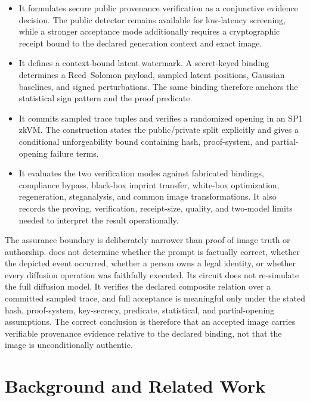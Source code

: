 \begin{itemize}
    \item It formulates secure public provenance verification as a conjunctive
    evidence decision.  The public detector remains available for low-latency
    screening, while a stronger acceptance mode additionally requires a
    cryptographic receipt bound to the declared generation context and exact
    image.

    \item It defines a context-bound latent watermark.  A secret-keyed binding
    determines a Reed--Solomon payload, sampled latent positions, Gaussian
    baselines, and signed perturbations.  The same binding therefore anchors the
    statistical sign pattern and the proof predicate.

    \item It commits sampled trace tuples and verifies a randomized opening in an
    SP1 zkVM.  The construction states the public/private split explicitly and
    gives a conditional unforgeability bound containing hash, proof-system, and
    partial-opening failure terms.

    \item It evaluates the two verification modes against fabricated bindings,
    compliance bypass, black-box imprint transfer, white-box optimization,
    regeneration, steganalysis, and common image transformations.  It also records
    the proving, verification, receipt-size, quality, and two-model limits
    needed to interpret the result operationally.
\end{itemize}

The assurance boundary is deliberately narrower than proof of image truth or
authorship.  \PPMark{} does not determine whether the prompt is factually correct,
whether the depicted event occurred, whether a person owns a legal identity, or
whether every diffusion operation was faithfully executed.  Its circuit does not
re-simulate the full diffusion model.  It verifies the declared composite relation
over a committed sampled trace, and full acceptance is meaningful only under the
stated hash, proof-system, key-secrecy, predicate, statistical, and partial-opening
assumptions.  The correct conclusion is therefore that an accepted image carries
verifiable provenance evidence relative to the declared binding, not that the
image is unconditionally authentic.

\section{Background and Related Work}
\label{sec:ch4-background}

